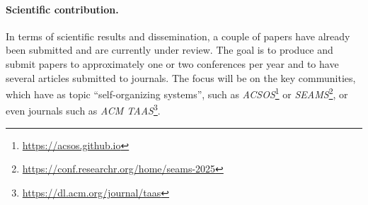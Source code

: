 \documentclass[12pt, a4paper]{article}
\begin{document}
\sloppypar
\paragraph{Scientific contribution.}
In terms of scientific results and dissemination,
a couple of papers have already been submitted and are currently under review.
%
The goal is to produce and submit papers to approximately one or two conferences per year and to have several articles submitted to journals.
%
The focus will be on the key communities, which have as topic ``self-organizing systems'',
such as \emph{ACSOS}\footnote{\url{https://acsos.github.io}} or \emph{SEAMS}\footnote{\url{https://conf.researchr.org/home/seams-2025}},
or even journals such as \emph{ACM TAAS}\footnote{\url{https://dl.acm.org/journal/taas}}.



\end{document}
